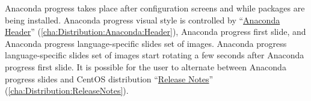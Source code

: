 
Anaconda progress takes place after configuration screens and while
packages are being installed.  Anaconda progress visual style is
controlled by ``\hyperlink{cha:Distribution:Anaconda:Header}{Anaconda
Header}'' (\autoref{cha:Distribution:Anaconda:Header}), Anaconda
progress first slide, and Anaconda progress language-specific slides
set of images. Anaconda progress language-specific slides set of
images start rotating a few seconds after Anaconda progress first
slide.  It is possible for the user to alternate between Anaconda
progress slides and CentOS distribution
``\hyperlink{cha:Distribution:ReleaseNotes}{Release Notes}''
(\autoref{cha:Distribution:ReleaseNotes}).

